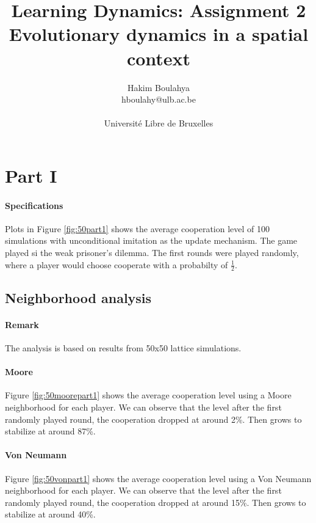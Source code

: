 \documentclass[letterpaper]{article}
\title{Learning Dynamics: Assignment 2 \\
\Large Evolutionary dynamics in a spatial context}
\author{\Large Hakim Boulahya \\
hboulahy@ulb.ac.be\\
\\
Université Libre de Bruxelles
}
\begin{document}
\maketitle
\tableofcontents
\newpage

\section{Part I}

\paragraph{Specifications}
Plots in Figure \ref{fig:50part1} shows the average cooperation level of 100
simulations with unconditional imitation as the update mechanism.
The game played si the weak prisoner's dilemma.
The first rounds were played randomly,
where a player would choose cooperate with a probabilty of $\frac{1}{2}$.

\subsection{Neighborhood analysis}

\label{neighborpart1}

\paragraph{Remark} The analysis is based on results from 50x50 lattice
simulations.

\paragraph{Moore}

Figure \ref{fig:50moorepart1} shows the average cooperation level
using a Moore neighborhood for each player.
We can observe that the level after the first randomly played round, the
cooperation dropped at around 2\%. Then grows to stabilize at around 87\%.

\paragraph{Von Neumann}

Figure \ref{fig:50vonpart1} shows the average cooperation level
using a Von Neumann neighborhood for each player.
We can observe that the level after the first randomly played round, the
cooperation dropped at around 15\%. Then grows to stabilize at around 40\%.
\end{document}
